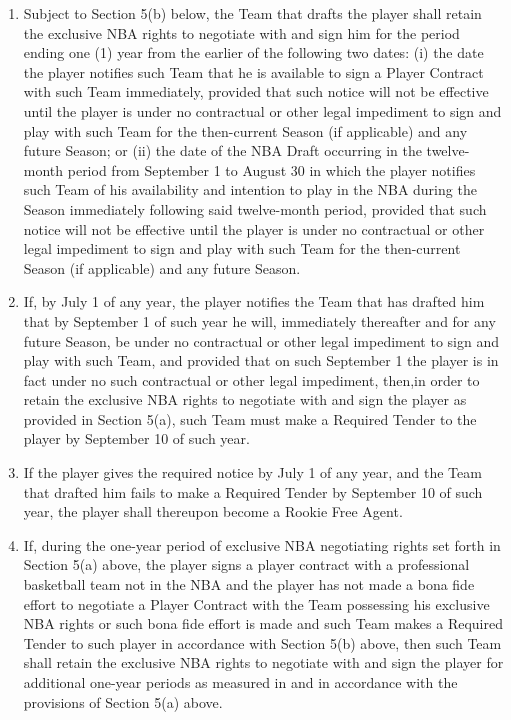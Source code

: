 \documentclass[
]{book}
\providecommand{\tightlist}{%
  \setlength{\itemsep}{0pt}\setlength{\parskip}{0pt}}
\begin{document}
\begin{enumerate}
\def\labelenumi{(\alph{enumi})}
\tightlist
\item
  Subject to Section 5(b) below, the Team that drafts the player shall retain the exclusive NBA rights to negotiate with and sign him for the period ending one (1) year from the earlier of the following two dates: (i) the date the player notifies such Team that he is available to sign a Player Contract with such Team immediately, provided that such notice will not be effective until the player is under no contractual or other legal impediment to sign and play with such Team for the then-current Season (if applicable) and any future Season; or (ii) the date of the NBA Draft occurring in the twelve-month period from September 1 to August 30 in which the player notifies such Team of his availability and intention to play in the NBA during the Season immediately following said twelve-month period, provided that such notice will not be effective until the player is under no contractual or other legal impediment to sign and play with such Team for the then-current Season (if applicable) and any future Season.
\item
  If, by July 1 of any year, the player notifies the Team that has drafted him that by September 1 of such year he will, immediately thereafter and for any future Season, be under no contractual or other legal impediment to sign and play with such Team, and provided that on such September 1 the player is in fact under no such contractual or other legal impediment, then,in order to retain the exclusive NBA rights to negotiate with and sign the player as provided in Section 5(a), such Team must make a Required Tender to the player by September 10 of such year.
\item
  If the player gives the required notice by July 1 of any year, and the Team that drafted him fails to make a Required Tender by September 10 of such year, the player shall thereupon become a Rookie Free Agent.
\item
  If, during the one-year period of exclusive NBA negotiating rights set forth in Section 5(a) above, the player signs a player contract with a professional basketball team not in the NBA and the player has not made a bona fide effort to negotiate a Player Contract with the Team possessing his exclusive NBA rights or such bona fide effort is made and such Team makes a Required Tender to such player in accordance with Section 5(b) above, then such Team shall retain the exclusive NBA rights to negotiate with and sign the player for additional one-year periods as measured in and in accordance with the provisions of Section 5(a) above.

\end{enumerate}
\end{document}
